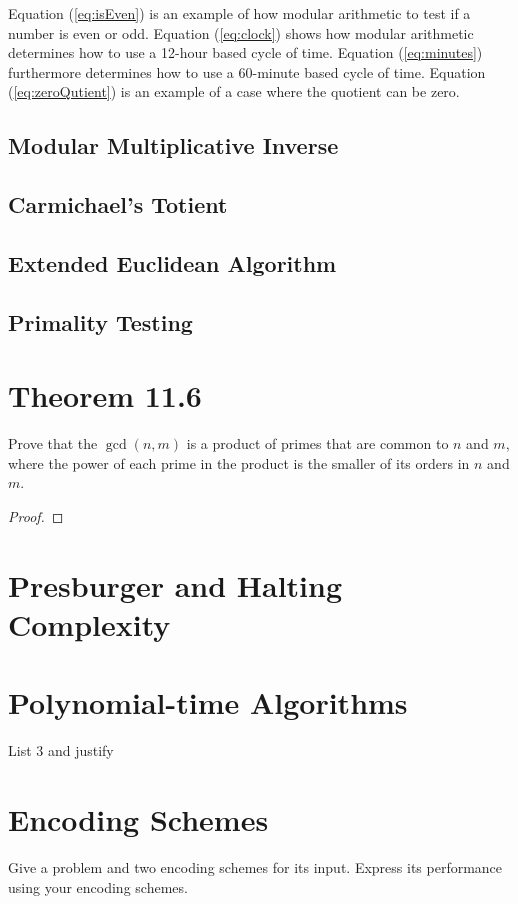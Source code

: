\documentclass{article}
\renewcommand{\_}{\ifincsname_\else\legacyunderscore\fi}
\begin{document}
        Equation (\ref{eq:isEven}) is an example of how modular arithmetic to test if a number is even or odd.  Equation (\ref{eq:clock}) shows how modular arithmetic determines how to use a 12-hour based cycle of time.  Equation (\ref{eq:minutes}) furthermore determines how to use a 60-minute based cycle of time.  Equation (\ref{eq:zeroQutient}) is an example of a case where the quotient can be zero.

    \subsection*{Modular Multiplicative Inverse}

    \subsection*{Carmichael's Totient}

    \subsection*{Extended Euclidean Algorithm}

    \subsection*{Primality Testing}

\section*{Theorem 11.6}

    Prove that the $\gcd(n, m)$ is a product of primes that are common to $n$ and $m$, where the power of each prime in the product is the smaller of its orders in $n$ and $m$.

    \begin{proof}
        
    \end{proof}

\section*{Presburger and Halting Complexity}

\section*{Polynomial-time Algorithms}

    List 3 and justify

\section*{Encoding Schemes}

    Give a problem and two encoding schemes for its input.  Express its performance using your encoding schemes.
\end{document}
